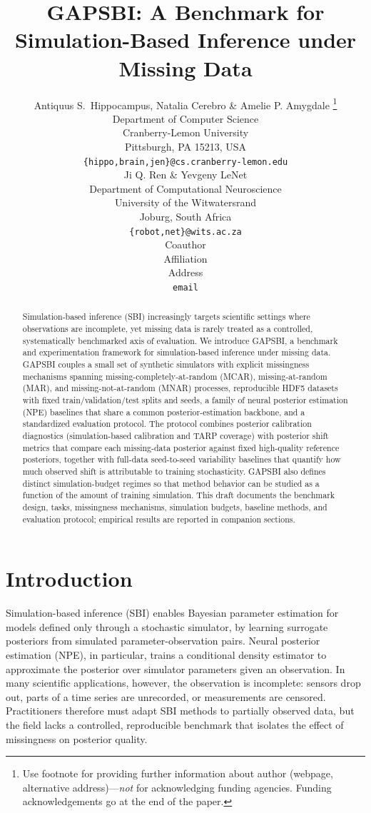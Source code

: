 \documentclass{article} %
\title{GAPSBI: A Benchmark for Simulation-Based Inference under Missing Data}
\author{Antiquus S.~Hippocampus, Natalia Cerebro \& Amelie P. Amygdale \thanks{ Use footnote for providing further information
about author (webpage, alternative address)---\emph{not} for acknowledging
funding agencies.  Funding acknowledgements go at the end of the paper.} \\
Department of Computer Science\\
Cranberry-Lemon University\\
Pittsburgh, PA 15213, USA \\
\texttt{\{hippo,brain,jen\}@cs.cranberry-lemon.edu} \\
\And
Ji Q. Ren \& Yevgeny LeNet \\
Department of Computational Neuroscience \\
University of the Witwatersrand \\
Joburg, South Africa \\
\texttt{\{robot,net\}@wits.ac.za} \\
\AND
Coauthor \\
Affiliation \\
Address \\
\texttt{email}
}
\begin{document}
\maketitle

\begin{abstract}
Simulation-based inference (SBI) increasingly targets scientific settings where
observations are incomplete, yet missing data is rarely treated as a controlled,
systematically benchmarked axis of evaluation. We introduce GAPSBI, a benchmark
and experimentation framework for simulation-based inference under missing data.
GAPSBI couples a small set of synthetic simulators with explicit missingness
mechanisms spanning missing-completely-at-random (MCAR), missing-at-random (MAR),
and missing-not-at-random (MNAR) processes, reproducible HDF5 datasets with
fixed train/validation/test splits and seeds, a family of neural posterior
estimation (NPE) baselines that share a common posterior-estimation backbone, and
a standardized evaluation protocol. The protocol combines posterior calibration
diagnostics (simulation-based calibration and TARP coverage) with posterior shift
metrics that compare each missing-data posterior against fixed high-quality
reference posteriors, together with full-data seed-to-seed variability baselines that
quantify how much observed shift is attributable to training stochasticity.
GAPSBI also defines distinct simulation-budget regimes so that method behavior
can be studied as a function of the amount of training simulation. This draft
documents the benchmark design, tasks, missingness mechanisms, simulation
budgets, baseline methods, and evaluation protocol; empirical results are
reported in companion sections.
\end{abstract}

\section{Introduction}
\label{sec:introduction}

Simulation-based inference (SBI) enables Bayesian parameter estimation for models
defined only through a stochastic simulator, by learning surrogate posteriors
from simulated parameter-observation pairs. Neural posterior estimation (NPE),
in particular, trains a conditional density estimator to approximate the
posterior over simulator parameters given an observation. In many scientific
applications, however, the observation is incomplete: sensors drop out, parts of
a time series are unrecorded, or measurements are censored. Practitioners
therefore must adapt SBI methods to partially observed data, but the field lacks
a controlled, reproducible benchmark that isolates the effect of missingness on
posterior quality.
\end{document}
